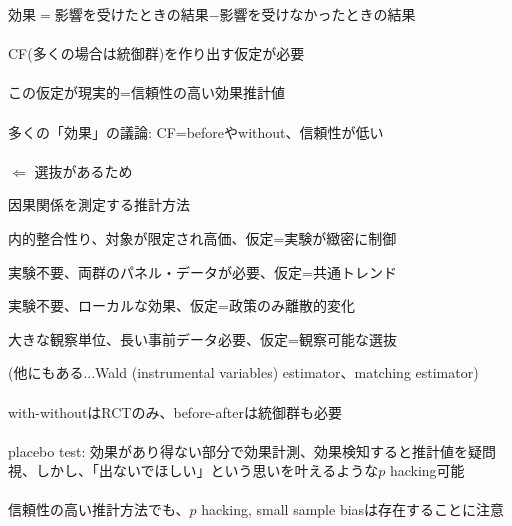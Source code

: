 \begin{frame}{}
効果$=$影響を受けたときの結果$-$影響を受けなかったときの結果\\~\\
\pause
CF(多くの場合は統御群)を作り出す仮定が必要\\~\\
\pause
この仮定が現実的=信頼性の高い効果推計値\\~\\
\pause
多くの「効果」の議論: CF=beforeやwithout、信頼性が低い\\~\\
\pause
$\Leftarrow$ 選抜があるため
\end{frame}

\begin{frame}{}
因果関係を測定する推計方法
\begin{description}
\vspace{1.0ex}\setlength{\itemsep}{1.0ex}\setlength{\baselineskip}{12pt}
\pause
\item[RCT]	内的整合性り、対象が限定され高価、仮定=実験が緻密に制御
\pause
\item[DID]	実験不要、両群のパネル・データが必要、仮定=共通トレンド
\pause
\item[RDD]	実験不要、ローカルな効果、仮定=政策のみ離散的変化
\pause
\item[SCM]	大きな観察単位、長い事前データ必要、仮定=観察可能な選抜
\end{description}
\pause
(他にもある...Wald (instrumental variables) estimator、matching estimator)\\~\\
\pause
with-withoutはRCTのみ、before-afterは統御群も必要\\~\\
\pause
placebo test: 効果があり得ない部分で効果計測、効果検知すると推計値を疑問視、しかし、「出ないでほしい」という思いを叶えるような$p$ hacking可能\\~\\
\pause
信頼性の高い推計方法でも、$p$ hacking, small sample biasは存在することに注意
\end{frame}

